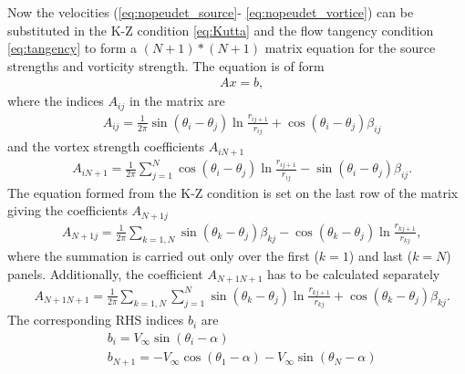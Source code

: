 \documentclass[a4paper,12pt]{article}
\begin{document}
Now the velocities (\ref{eq:nopeudet_source}- \ref{eq:nopeudet_vortice}) can be substituted in the K-Z condition \ref{eq:Kutta} and the flow tangency condition \ref{eq:tangency} to form a $(N+1) * (N+1)$ matrix equation for the source strengths and vorticity strength. The equation is of form 
\begin{equation}
\begin{split}
&Ax = b,
\end{split}
\label{eq:matriisi1}
\end{equation}
where the indices $A_{ij}$ in the matrix are 
\begin{equation}
\begin{split}
&A_{ij} = \frac{1}{2\pi}\sin(\theta_i - \theta_j) \ln \frac{r_{ij+1}}{r_{ij}}+\cos(\theta_i - \theta_j) \beta_{ij}
\end{split}
\label{eq:aij}
\end{equation}
and the vortex strength coefficients $A_{iN+1}$
\begin{equation}
\begin{split}
&A_{iN+1} = \frac{1}{2\pi} \sum_{j=1}^N\cos(\theta_i - \theta_j) \ln \frac{r_{ij+1}}{r_{ij}}-\sin(\theta_i - \theta_j) \beta_{ij}.
\end{split}
\label{eq:ain+1}
\end{equation}
The equation formed from the K-Z condition is set on the last row of the matrix giving the coefficients $A_{N+1j}$
\begin{equation}
\begin{split}
&A_{N+1j} =\frac{1}{2\pi} \sum_{k=1,N} \sin(\theta_k - \theta_j) \beta_{kj} - \cos(\theta_k - \theta_j) \ln \frac{r_{kj+1}}{r_{kj}},
\end{split}
\label{eq:an+j}
\end{equation}
where the summation is carried out only over the first ($k=1$) and last ($k=N$) panels.
Additionally, the coefficient $A_{N+1N+1}$ has to be calculated separately
\begin{equation}
\begin{split}
&A_{N+1N+1} =\frac{1}{2\pi} \sum_{k=1,N}\sum_{j=1}^N \sin(\theta_k - \theta_j) \ln \frac{r_{kj+1}}{r_{kj}} + \cos(\theta_k - \theta_j) \beta_{kj}.
\end{split}
\label{eq:an+1n+1}
\end{equation}
The corresponding RHS indices $b_i$ are 
\begin{equation}
\begin{split}
&b_i = V_\infty \sin(\theta_i - \alpha)\\
&b_{N+1} = -V_\infty \cos(\theta_1 - \alpha) -V_\infty \sin(\theta_N - \alpha)
\end{split}
\label{eq:an+1n+1}
\end{equation}
\end{document}
